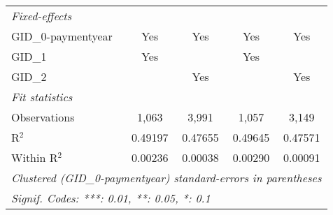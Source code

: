 \begin{tabular}{lcccc}
   \midrule
   \emph{Fixed-effects}\\
   GID\_0-paymentyear                                  & Yes      & Yes      & Yes      & Yes\\  
   GID\_1                                              & Yes      &          & Yes      & \\  
   GID\_2                                              &          & Yes      &          & Yes\\  
   \midrule
   \emph{Fit statistics}\\
   Observations                                        & 1,063    & 3,991    & 1,057    & 3,149\\  
   R$^2$                                               & 0.49197  & 0.47655  & 0.49645  & 0.47571\\  
   Within R$^2$                                        & 0.00236  & 0.00038  & 0.00290  & 0.00091\\  
   \midrule \midrule
   \multicolumn{5}{l}{\emph{Clustered (GID\_0-paymentyear) standard-errors in parentheses}}\\
   \multicolumn{5}{l}{\emph{Signif. Codes: ***: 0.01, **: 0.05, *: 0.1}}\\
\end{tabular}
\par\endgroup



